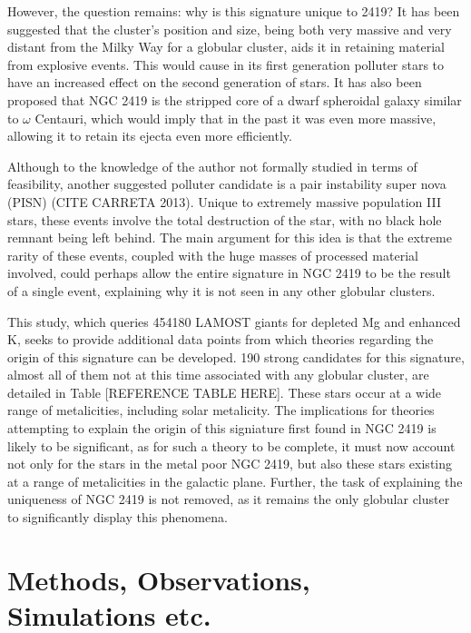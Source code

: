 \documentclass[a4paper,fleqn,usenatbib]{mnras}
\begin{document}
However, the question remains: why is this signature unique to 2419? It has been suggested that the cluster's position and size, being both very massive and very distant from the Milky Way for a globular cluster, aids it in retaining material from explosive events. This would cause in its first generation polluter stars to have an increased effect on the second generation of stars. It has also been proposed that NGC 2419 is the stripped core of a dwarf spheroidal galaxy similar to $\omega$ Centauri, which would imply that in the past it was even more massive, allowing it to retain its ejecta even more efficiently.

Although to the knowledge of the author not formally studied in terms of feasibility, another suggested polluter candidate is a pair instability super nova (PISN) (CITE CARRETA 2013). Unique to extremely massive population III stars, these events involve the total destruction of the star, with no black hole remnant being left behind. The main argument for this idea is that the extreme rarity of these events, coupled with the huge masses of processed material involved, could perhaps allow the entire signature in NGC 2419 to be the result of a single event, explaining why it is not seen in any other globular clusters.

This study, which queries 454180 LAMOST giants for depleted Mg and enhanced K, seeks to provide additional data points from which theories regarding the origin of this signature can be developed. 190 strong candidates for this signature, almost all of them not at this time associated with any globular cluster, are detailed in Table [REFERENCE TABLE HERE]. These stars occur at a wide range of metalicities, including solar metalicity. The implications for theories attempting to explain the origin of this signiature first found in NGC 2419 is likely to be significant, as for such a theory to be complete, it must now account not only for the stars in the metal poor NGC 2419, but also these stars existing at a range of metalicities in the galactic plane. Further, the task of explaining the uniqueness of NGC 2419 is not removed, as it remains the only globular cluster to significantly display this phenomena.

\section{Methods, Observations, Simulations etc.}
\end{document}
